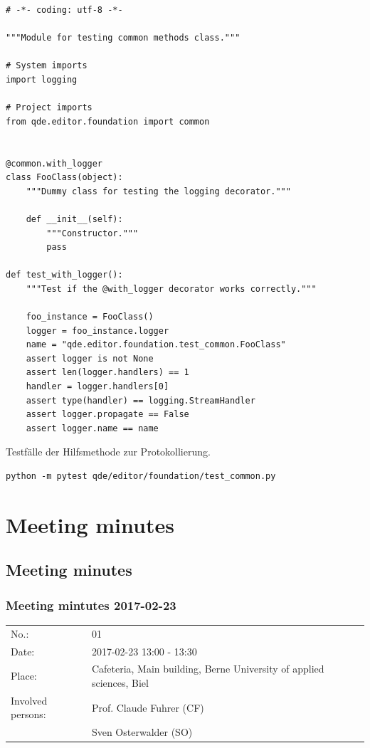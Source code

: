 \documentclass[10pt, openright, notitlepage]{scrreprt}
\begin{document}
\begin{listing}[H]
\begin{verbatim}
# -*- coding: utf-8 -*-

"""Module for testing common methods class."""

# System imports
import logging

# Project imports
from qde.editor.foundation import common


@common.with_logger
class FooClass(object):
    """Dummy class for testing the logging decorator."""

    def __init__(self):
        """Constructor."""
        pass

def test_with_logger():
    """Test if the @with_logger decorator works correctly."""

    foo_instance = FooClass()
    logger = foo_instance.logger
    name = "qde.editor.foundation.test_common.FooClass"
    assert logger is not None
    assert len(logger.handlers) == 1
    handler = logger.handlers[0]
    assert type(handler) == logging.StreamHandler
    assert logger.propagate == False
    assert logger.name == name
\end{verbatim}
\caption{\label{fig:editor-common-logging-test}
Testfälle der Hilfsmethode zur Protokollierung.}
\end{listing}

\begin{verbatim}
python -m pytest qde/editor/foundation/test_common.py
\end{verbatim}
\section{Meeting minutes}
\label{sec:org7f0075c}
\subsection{Meeting minutes}
\label{sec:org32af344}

\subsubsection{Meeting mintutes 2017-02-23}
\label{sec:orgeec77e7}

\begin{center}
\begin{tabular}{ll}
No.: & 01\\
Date: & 2017-02-23 13:00 - 13:30\\
Place: & Cafeteria, Main building, Berne University of applied sciences, Biel\\
Involved persons: & Prof. Claude Fuhrer (CF)\\
 & Sven Osterwalder (SO)\\
\end{tabular}
\end{center}
\end{document}
